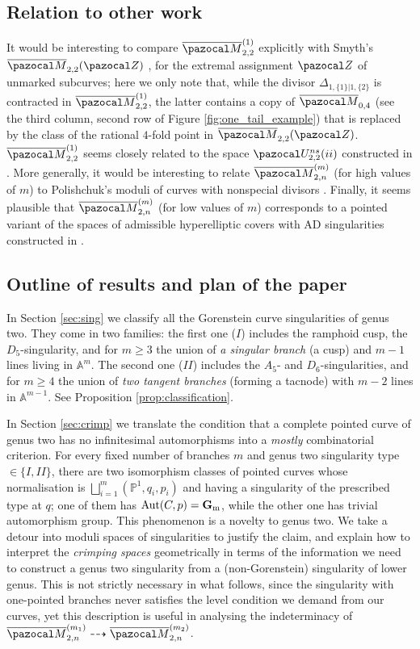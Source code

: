 \documentclass{compositio}
\newcommand{\PP}{\mathbb P}
\newcommand{\Aaff}{\mathbb A}
\newcommand{\oM}{\overline{\pazocal M}}
\newcommand{\Gm}{\mathbb{G}_{\rm{m}}}
\newcommand{\Aut}{\operatorname{Aut}}
\theoremstyle{plain}
\theoremstyle{definition}
\theoremstyle{remark}
\begin{document}
\subsection{Relation to other work} It would be interesting to compare $\oM_{2,2}^{(1)}$ explicitly with Smyth's $\oM_{2,2}(\pazocal Z)$ \cite{SMY-towards}, for the extremal assignment $\pazocal Z$ of unmarked subcurves; here we only note that, while the divisor $\Delta_{1,\{1\}|1,\{2\}}$ is contracted in $\oM_{2,2}^{(1)}$, the latter contains a copy of $\oM_{0,4}$ (see the third column, second row of Figure \ref{fig:one_tail_example}) that is replaced by the class of the rational $4$-fold point in $\oM_{2,2}(\pazocal Z)$. $\oM_{2,2}^{(1)}$ seems closely related to the space $\pazocal U^{ns}_{2,2}(ii)$ constructed in \cite{PolishchukJohnson}. More generally, it would be interesting to relate $\oM_{2,n}^{(m)}$ (for high values of $m$) to Polishchuk's moduli of curves with nonspecial divisors \cite{Polishchuk-nonspecial}. Finally, it seems plausible that $\oM_{2,n}^{(m)}$ (for low values of $m$) corresponds to a pointed variant of the spaces of admissible hyperelliptic covers with AD singularities constructed in \cite{Fedorchuk-hyperellipticAD}.

\subsection{Outline of results and plan of the paper} In Section \ref{sec:sing} we classify all the Gorenstein curve singularities of genus two. They come in two families: the first one ($I$) includes the ramphoid cusp, the $D_5$-singularity, and for $m\geq 3$ the union of \emph{a singular branch} (a cusp) and $m-1$ lines living in $\Aaff^m$. The second one ($I\!I$) includes the $A_5$- and $D_6$-singularities, and for $m\geq 4$ the union of \emph{two tangent branches} (forming a tacnode) with $m-2$ lines in $\Aaff^{m-1}$. See Proposition \ref{prop:classification}.

In Section \ref{sec:crimp} we translate the condition that a complete pointed curve of genus two has no infinitesimal automorphisms into a \emph{mostly} combinatorial criterion. For every fixed number of branches $m$ and genus two singularity type $\in\{I,I\!I\}$, there are two isomorphism classes of pointed curves whose normalisation is $\bigsqcup_{i=1}^m(\PP^1,q_i,p_i)$ and having a singularity of the prescribed type at $q$; one of them has $\Aut(C,p)=\Gm$, while the other one has trivial automorphism group. This phenomenon is a novelty to genus two. We take a detour into moduli spaces of singularities to justify the claim, and explain how to interpret the \emph{crimping spaces} geometrically in terms of the information we need to construct a genus two singularity from a (non-Gorenstein) singularity of lower genus. This is not strictly necessary in what follows, since the singularity with one-pointed branches never satisfies the level condition we demand from our curves, yet this description is useful in analysing the indeterminacy of $\oM_{2,n}^{(m_1)}\dashrightarrow\oM_{2,n}^{(m_2)}$.
\end{document}
